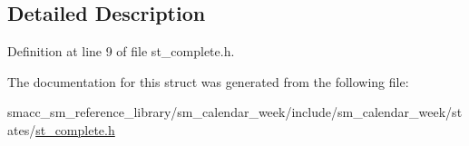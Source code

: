 \subsection{Detailed Description}


Definition at line 9 of file st\+\_\+complete.\+h.



The documentation for this struct was generated from the following file\+:\begin{DoxyCompactItemize}
\item 
smacc\+\_\+sm\+\_\+reference\+\_\+library/sm\+\_\+calendar\+\_\+week/include/sm\+\_\+calendar\+\_\+week/states/\hyperlink{sm__calendar__week_2include_2sm__calendar__week_2states_2st__complete_8h}{st\+\_\+complete.\+h}\end{DoxyCompactItemize}
